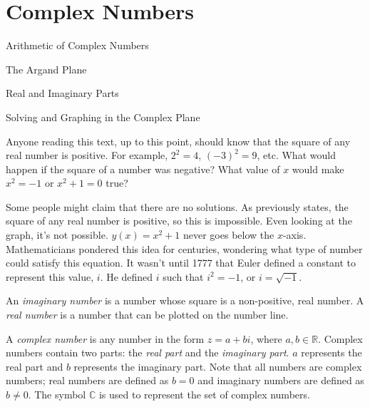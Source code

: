 \documentclass[lang=en,11pt]{elegantbook}
\begin{document}
\chapter{Complex Numbers}
\begin{introduction}[Contents]
\item Arithmetic of Complex Numbers
\item The Argand Plane
\item Real and Imaginary Parts
\item Solving and Graphing in the Complex Plane
\end{introduction}
\noindent Anyone reading this text, up to this point, should know that the square of any real number is positive.  For example, $2^2=4$, $(-3)^2=9$, etc.  What would happen if the square of a number was negative?  What value of $x$ would make $x^2=-1$ or $x^2+1=0$ true?

Some people might claim that there are no solutions.  As previously states, the square of any real number is positive, so this is impossible.  Even looking at the graph, it's not possible.  $y(x)=x^2+1$ never goes below the $x$-axis.  Mathematicians pondered this idea for centuries, wondering what type of number could satisfy this equation.  It wasn't until 1777 that Euler defined a constant to represent this value, $i$.  He defined $i$ such that $i^2=-1$, or $i=\sqrt{-1}$.

An \textit{imaginary number} is a number whose square is a non-positive, real number.  A \textit{real number} is a number that can be plotted on the number line.

A \textit{complex number} is any number in the form $z=a+bi$, where $a,b\in\mathbb{R}$.  Complex numbers contain two parts: the \textit{real part} and the \textit{imaginary part}.  $a$ represents the real part and $b$ represents the imaginary part.  Note that all numbers are complex numbers; real numbers are defined as $b=0$ and imaginary numbers are defined as $b\neq 0$.  The symbol $\mathbb{C}$ is used to represent the set of complex numbers.
\end{document}

